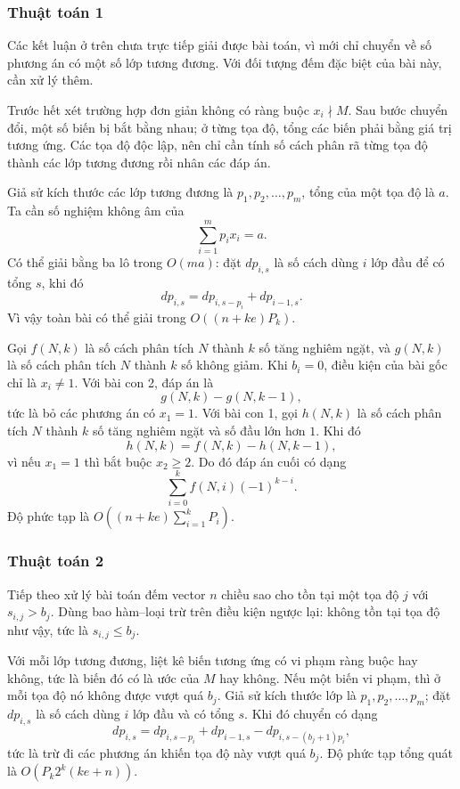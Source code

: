 \documentclass[11pt]{article}
\begin{document}
\subsubsection{Thuật toán 1}

Các kết luận ở trên chưa trực tiếp giải được bài toán, vì mới chỉ chuyển về số
phương án có một số lớp tương đương. Với đối tượng đếm đặc biệt của bài này,
cần xử lý thêm.

Trước hết xét trường hợp đơn giản không có ràng buộc \(x_i\nmid M\). Sau bước
chuyển đổi, một số biến bị bắt bằng nhau; ở từng tọa độ, tổng các biến phải
bằng giá trị tương ứng. Các tọa độ độc lập, nên chỉ cần tính số cách phân rã
từng tọa độ thành các lớp tương đương rồi nhân các đáp án.

Giả sử kích thước các lớp tương đương là \(p_1,p_2,\ldots,p_m\), tổng của một
tọa độ là \(a\). Ta cần số nghiệm không âm của
\[
  \sum_{i=1}^{m}p_i x_i=a.
\]
Có thể giải bằng ba lô trong \(O(ma)\): đặt \(dp_{i,s}\) là số cách dùng
\(i\) lớp đầu để có tổng \(s\), khi đó
\[
  dp_{i,s}=dp_{i,s-p_i}+dp_{i-1,s}.
\]
Vì vậy toàn bài có thể giải trong \(O((n+ke)P_k)\).

Gọi \(f(N,k)\) là số cách phân tích \(N\) thành \(k\) số tăng nghiêm ngặt, và
\(g(N,k)\) là số cách phân tích \(N\) thành \(k\) số không giảm. Khi \(b_i=0\),
điều kiện của bài gốc chỉ là \(x_i\ne 1\). Với bài con 2, đáp án là
\[
  g(N,k)-g(N,k-1),
\]
tức là bỏ các phương án có \(x_1=1\). Với bài con 1, gọi \(h(N,k)\) là số cách
phân tích \(N\) thành \(k\) số tăng nghiêm ngặt và số đầu lớn hơn \(1\). Khi đó
\[
  h(N,k)=f(N,k)-h(N,k-1),
\]
vì nếu \(x_1=1\) thì bắt buộc \(x_2\ge 2\). Do đó đáp án cuối có dạng
\[
  \sum_{i=0}^{k} f(N,i)(-1)^{k-i}.
\]
Độ phức tạp là \(O((n+ke)\sum_{i=1}^{k}P_i)\).

\subsubsection{Thuật toán 2}

Tiếp theo xử lý bài toán đếm vector \(n\) chiều sao cho tồn tại một tọa độ
\(j\) với \(s_{i,j}>b_j\). Dùng bao hàm--loại trừ trên điều kiện ngược lại:
không tồn tại tọa độ như vậy, tức là \(s_{i,j}\le b_j\).

Với mỗi lớp tương đương, liệt kê biến tương ứng có vi phạm ràng buộc hay không,
tức là biến đó có là ước của \(M\) hay không. Nếu một biến vi phạm, thì ở mỗi
tọa độ nó không được vượt quá \(b_j\). Giả sử kích thước lớp là
\(p_1,p_2,\ldots,p_m\); đặt \(dp_{i,s}\) là số cách dùng \(i\) lớp đầu và có
tổng \(s\). Khi đó chuyển có dạng
\[
  dp_{i,s}=dp_{i,s-p_i}+dp_{i-1,s}-dp_{i,s-(b_j+1)p_i},
\]
tức là trừ đi các phương án khiến tọa độ này vượt quá \(b_j\). Độ phức tạp
tổng quát là \(O(P_k2^k(ke+n))\).
\end{document}
